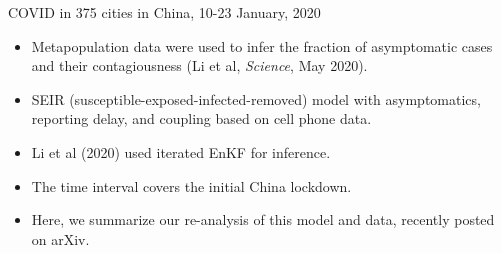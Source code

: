 \documentclass{beamer}
\begin{document}
\begin{frame}{COVID in 375 cities in China, 10-23 January, 2020}

  \begin{itemize}
  \item Metapopulation data were used to infer the fraction of asymptomatic cases and their contagiousness
    (Li et al, {\it Science}, May 2020).
  \item SEIR (susceptible-exposed-infected-removed) model with asymptomatics, reporting delay, and coupling based on cell phone data.
  \item Li et al (2020) used iterated EnKF for inference.
  \item The time interval covers the initial China lockdown.
  \item Here, we summarize our re-analysis of this model and data, recently posted on arXiv.

\end{itemize}     

\end{frame}
\end{document}
